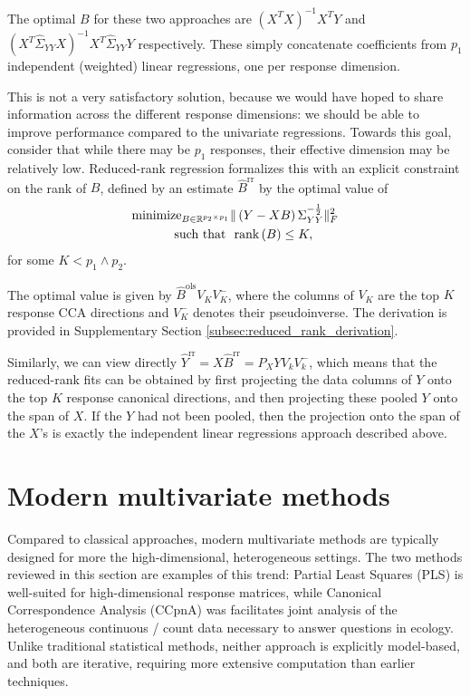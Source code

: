 \documentclass[14pt]{extarticle}
\begin{document}
The optimal $B$ for these two approaches are $\left(X^{T}X\right)^{-1}X^{T}Y$
and $\left(X^{T}\hat{\Sigma}_{YY} X\right)^{-1}X^{T}\hat{\Sigma}_{YY}Y$
respectively. These simply concatenate coefficients from $p_{1}$ independent
(weighted) linear regressions, one per response dimension.

This is not a very satisfactory solution, because we would have hoped to share
information across the different response dimensions: we should be able to
improve performance compared to the univariate regressions. Towards this goal,
consider that while there may be $p_{1}$ responses, their effective dimension
may be relatively low. Reduced-rank regression formalizes this with an explicit
constraint on the rank of $B$, defined by an estimate $\hat{B}^{\text{rr}}$ by
the optimal value of
\begin{align}
\text{minimize}_{B \in \mathbb{R}^{p_{2} \times p_{1}}} &\|\left(Y - XB\right)\Sigma_{YY}^{-\frac{1}{2}}\|_{F}^{2} \label{eq:rr_obj}\\
\text{such that } &\text{ rank}\left(B\right) \leq K, \nonumber
\end{align}
for some $K < p_{1}\wedge p_{2}$.

The optimal value is given by $\hat{B}^{\text{ols}}V_{K}V_{K}^{-}$, where the
columns of $V_{K}$ are the top $K$ response CCA directions and $V_{K}^{-}$
denotes their pseudoinverse. The derivation is provided in Supplementary Section
\ref{subsec:reduced_rank_derivation}.

Similarly, we can view directly $\hat{Y}^{\text{rr}} = X\hat{B}^{\text{rr}} =
P_{X}YV_{k}V_{k}^{-}$, which means that the reduced-rank fits can be obtained by
first projecting the data columns of $Y$ onto the top $K$ response canonical
directions, and then projecting these pooled $Y$ onto the span of $X$. If the
$Y$ had not been pooled, then the projection onto the span of the $X$'s is
exactly the independent linear regressions approach described above.

\section{Modern multivariate methods}

Compared to classical approaches, modern multivariate methods are typically
designed for more the high-dimensional, heterogeneous settings. The two methods
reviewed in this section are examples of this trend: Partial Least Squares (PLS)
is well-suited for high-dimensional response matrices, while Canonical
Correspondence Analysis (CCpnA) was facilitates joint analysis of the
heterogeneous continuous / count data necessary to answer questions in ecology.
Unlike traditional statistical methods, neither approach is explicitly
model-based, and both are iterative, requiring more extensive computation than
earlier techniques.
\end{document}
